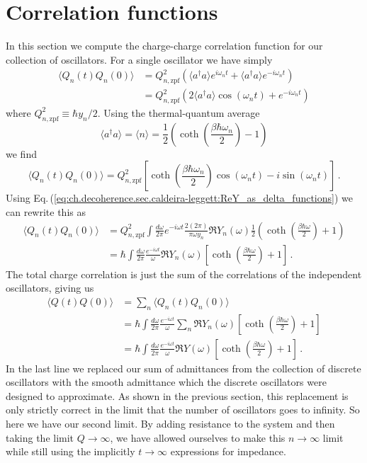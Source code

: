 \section{Correlation functions}

In this section we compute the charge-charge correlation function for our collection of oscillators.
For a single oscillator we have simply
\begin{align}
\langle Q_n(t) Q_n(0) \rangle
&= Q_{n,\text{zpf}}^2 \left( \langle a^\dagger a \rangle e^{i \omega_n t} + \langle a^\dagger a \rangle e^{-i \omega_n t} \right) \\
&= Q_{n,\text{zpf}}^2 \left( 2\langle a^\dagger a \rangle \cos(\omega_n t) + e^{-i \omega_n t} \right)
\end{align}
where $Q_{n,\text{zpf}}^2 \equiv \hbar y_n / 2$.
Using the thermal-quantum average
\begin{equation}
\langle a^\dagger a \rangle = \langle n \rangle = \frac{1}{2} \left( \coth \left( \frac{\beta \hbar \omega_n}{2} \right) - 1 \right)
\end{equation}
we find
\begin{equation}
\langle Q_n(t) Q_n(0) \rangle
= Q_{n,\text{zpf}}^2 \left[ \coth \left( \frac{\beta \hbar \omega_n}{2} \right) \cos(\omega_n t) -i \sin ( \omega_n t) \right] \, .
\end{equation}
Using Eq.\,(\ref{eq:ch.decoherence.sec.caldeira-leggett:ReY_as_delta_functions}) we can rewrite this as
\begin{align}
\langle Q_n(t) Q_n(0) \rangle
&= Q_{n,\text{zpf}}^2
\int \frac{d\omega}{2 \pi} e^{-i \omega t} \frac{2 (2\pi)}{\pi \omega y_n} \Re Y_n(\omega) \frac{1}{2} \left( \coth \left( \frac{\beta \hbar \omega}{2} \right) + 1 \right) \\
&= \hbar \int \frac{d\omega}{2 \pi} \frac{e^{-i \omega t}}{\omega} \Re Y_n (\omega) \left[ \coth \left( \frac{\beta \hbar \omega}{2} \right) + 1 \right] \, .
\end{align}
The total charge correlation is just the sum of the correlations of the independent oscillators, giving us
\begin{align}
\langle Q(t) Q(0) \rangle
&= \sum_n \langle Q_n(t) Q_n(0) \rangle \\
&= \hbar \int \frac{d\omega}{2 \pi} \frac{e^{-i \omega t}}{\omega} \sum_n \Re Y_n (\omega) \left[ \coth \left( \frac{\beta \hbar \omega}{2} \right) + 1 \right] \\
&= \hbar \int \frac{d\omega}{2 \pi} \frac{e^{-i \omega t}}{\omega} \Re Y(\omega) \left[ \coth \left( \frac{\beta \hbar \omega}{2} \right) + 1 \right] \, .
\end{align}
In the last line we replaced our sum of admittances from the collection of discrete oscillators with the smooth admittance which the discrete oscillators were designed to approximate.
As shown in the previous section, this replacement is only strictly correct in the limit that the number of oscillators goes to infinity.
So here we have our second limit.
By adding resistance to the system and then taking the limit $Q \rightarrow \infty$, we have allowed ourselves to make this $n \rightarrow \infty$ limit while still using the implicitly  $t \rightarrow \infty$ expressions for impedance.

